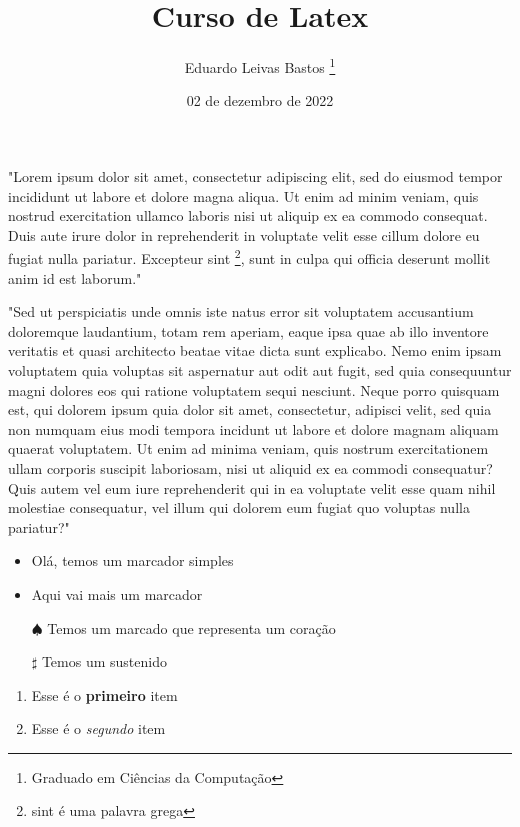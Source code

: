 \documentclass[12pt, a4paper]{article}
\begin{document}
\title{Curso de Latex}
\author{Eduardo Leivas Bastos \footnote{Graduado em Ciências da Computação}}
\date{02 de dezembro de 2022}
\maketitle
\onehalfspacing

"Lorem ipsum dolor sit amet, consectetur adipiscing elit, sed do eiusmod tempor incididunt ut labore et dolore magna aliqua. Ut enim ad minim veniam, quis nostrud exercitation ullamco laboris nisi ut aliquip ex ea commodo consequat. Duis aute irure dolor in reprehenderit in voluptate velit esse cillum dolore eu fugiat nulla pariatur. Excepteur sint \footnote {sint é uma palavra grega}, sunt in culpa qui officia deserunt mollit anim id est laborum."

"Sed ut perspiciatis unde omnis iste natus error sit voluptatem accusantium doloremque laudantium, totam rem aperiam, eaque ipsa quae ab illo inventore veritatis et quasi architecto beatae vitae dicta sunt explicabo. Nemo enim ipsam voluptatem quia voluptas sit aspernatur aut odit aut fugit, sed quia consequuntur magni dolores eos qui ratione voluptatem sequi nesciunt. Neque porro quisquam est, qui dolorem ipsum quia dolor sit amet, consectetur, adipisci velit, sed quia non numquam eius modi tempora incidunt ut labore et dolore magnam aliquam quaerat voluptatem. Ut enim ad minima veniam, quis nostrum exercitationem ullam corporis suscipit laboriosam, nisi ut aliquid ex ea commodi consequatur? Quis autem vel eum iure reprehenderit qui in ea voluptate velit esse quam nihil molestiae consequatur, vel illum qui dolorem eum fugiat quo voluptas nulla pariatur?"

\begin{itemize}
	\item Olá, temos um marcador simples
	\item Aqui vai mais um marcador
\end{itemize}

\begin{itemize}
	\item[$\spadesuit$] Temos um marcado que representa um coração
	\item[$\sharp$] Temos um sustenido
\end{itemize}

\begin{enumerate}
	\item Esse é o \textbf{primeiro} item
	\item Esse é o \textit{segundo} item
\end{enumerate}
\end{document}
